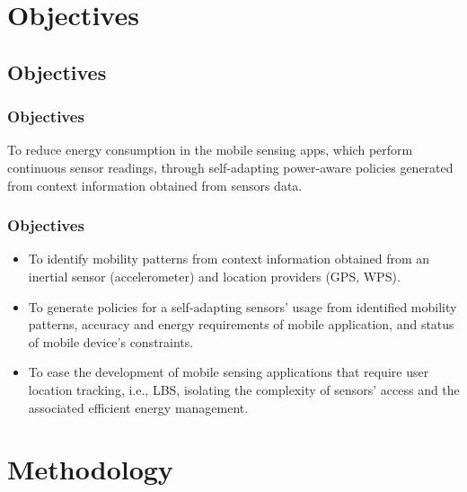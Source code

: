\documentclass[compress,9pt,xcolor={dvipsnames,table}]{beamer}
\begin{document}
\section{Objectives}
\subsection{Objectives}
\begin{frame}\frametitle{Objectives}
\begin{tcolorbox}[title=Main objective,colframe=PineGreen]
To reduce energy consumption in the mobile sensing apps, which perform continuous sensor readings, through self-adapting power-aware policies generated from context information obtained from sensors data.
\end{tcolorbox}
\end{frame}

\begin{frame}\frametitle{Objectives}
\begin{tcolorbox}[title=Particular objectives,colframe=PineGreen]
\small
\begin{itemize}
  \item To identify mobility patterns from context information obtained from an inertial sensor (accelerometer) and location providers (GPS, WPS).
  \item To generate policies for a self-adapting sensors' usage from identified mobility patterns, accuracy and energy requirements of mobile application, and status of mobile device's constraints. 
  \item To ease the development of mobile sensing applications that require user location tracking, i.e., LBS, isolating the complexity of sensors' access and the associated efficient energy management.
\end{itemize}
\end{tcolorbox}
\end{frame}


\section{Methodology}
\end{document}

